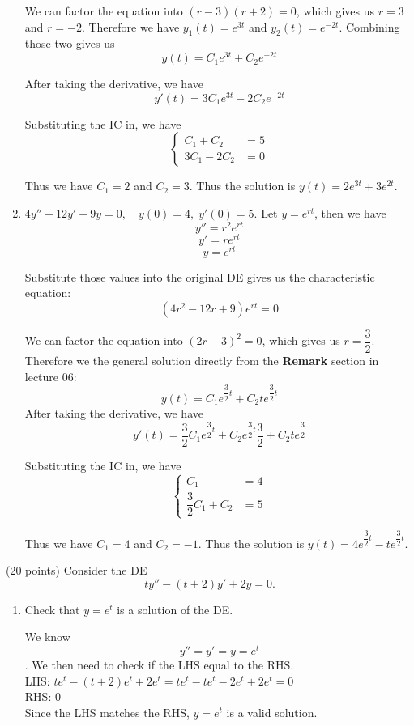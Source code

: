 \documentclass{article}
\newcommand{\benum}{\begin{enumerate}}
\newcommand{\eenum}{\end{enumerate}}
\begin{document}
\begin{enumerate}
We can factor the equation into $(r-3)(r+2) = 0$, which gives us $r = 3$ and $r = -2$. Therefore we have $y_1(t) = e^{3t}$ and $y_2(t) = e^{-2t}$. Combining those two gives us $$y(t) = C_1e^{3t}+C_2e^{-2t}$$

After taking the derivative, we have $$y'(t) = 3C_1e^{3t}-2C_2e^{-2t}$$

Substituting the IC in, we have 
\begin{equation*}
	\begin{cases}
		C_1+C_2 &= 5\\
		3C_1 - 2C_2 &= 0
	\end{cases}
\end{equation*}

Thus we have $C_1 = 2$ and $C_2 = 3$. Thus the solution is $y(t) = 2e^{3t}+3e^{2t}$.
\item $4y''-12y'+9y=0, \quad y(0)=4, \; y'(0)=5.$
Let $y = e^{rt}$, then we have $$y'' = r^2e^{rt}$$ $$y' = re^{rt}$$  $$y = e^{rt}$$

Substitute those values into the original DE gives us the characteristic equation: $$(4r^2-12r+9)e^{rt} = 0$$

We can factor the equation into $(2r-3)^2= 0$, which gives us $r = \dfrac{3}{2}$. Therefore we the general solution directly from the \textbf{Remark} section in lecture 06: $$y(t) = C_1e^{\dfrac{3}{2}t}+C_2te^{\dfrac{3}{2}t}$$  
After taking the derivative, we have $$y'(t) = \dfrac{3}{2}C_1e^{\dfrac{3}{2}t}+C_2e^{\dfrac{3}{2}t}\dfrac{3}{2}+C_2te^{\dfrac{3}{2}}$$


Substituting the IC in, we have 
\begin{equation*}
	\begin{cases}
		C_1 &= 4\\
		\dfrac{3}{2}C_1 + C_2 &= 5
	\end{cases}
\end{equation*}

Thus we have $C_1 = 4$ and $C_2 = -1$. Thus the solution is $y(t) = 4e^{\dfrac{3}{2}t}-te^{\dfrac{3}{2}t}$.
\eenum

\newpage

\item (20 points)
Consider the DE
\begin{equation*}
ty''-(t+2)y'+2y=0.
\end{equation*}
\benum
\item Check that $y=e^t$ is a solution of the DE.
 
We know $$y'' = y' = y = e^t$$. We then need to check if the LHS equal to the RHS.\\
LHS: $te^{t}-(t+2)e^{t}+2e^{t}=te^{t}-te^{t}-2e^{t}+2e^{t}=0$\\
RHS: $0$\\
Since the LHS matches the RHS, $y=e^t$ is a valid solution.


\end{enumerate}
\end{document}

